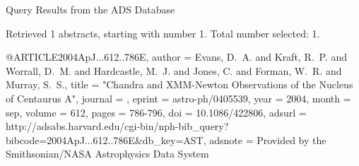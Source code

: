 Query Results from the ADS Database


Retrieved 1 abstracts, starting with number 1.  Total number selected: 1.

@ARTICLE{2004ApJ...612..786E,
   author = {{Evans}, D.~A. and {Kraft}, R.~P. and {Worrall}, D.~M. and {Hardcastle}, M.~J. and 
	{Jones}, C. and {Forman}, W.~R. and {Murray}, S.~S.},
    title = "{Chandra and XMM-Newton Observations of the Nucleus of Centaurus A}",
  journal = {\apj},
   eprint = {astro-ph/0405539},
     year = 2004,
    month = sep,
   volume = 612,
    pages = {786-796},
      doi = {10.1086/422806},
   adsurl = {http://adsabs.harvard.edu/cgi-bin/nph-bib_query?bibcode=2004ApJ...612..786E&db_key=AST},
  adsnote = {Provided by the Smithsonian/NASA Astrophysics Data System}
}


